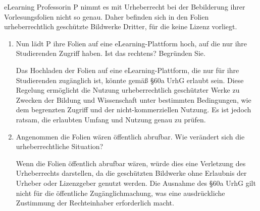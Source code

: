 \documentclass{article}
\begin{document}
\begin{exercise}{eLearning}
  Professorin P nimmt es mit Urheberrecht bei der Bebilderung ihrer Vorlesungsfolien nicht so genau. Daher befinden sich in den Folien urheberrechtlich geschützte Bildwerke Dritter, für die keine Lizenz vorliegt.
  \begin{enumerate}
    \item Nun lädt P ihre Folien auf eine eLearning-Plattform hoch, auf die nur ihre Studierenden Zugriff haben. Ist das rechtens? Begründen Sie.

          \begin{solution}
            Das Hochladen der Folien auf eine eLearning-Plattform, die nur für ihre Studierenden zugänglich ist, könnte gemäß §60a UrhG erlaubt sein. Diese Regelung ermöglicht die Nutzung urheberrechtlich geschützter Werke zu Zwecken der Bildung und Wissenschaft unter bestimmten Bedingungen, wie dem begrenzten Zugriff und der nicht-kommerziellen Nutzung. Es ist jedoch ratsam, die erlaubten Umfang und Nutzung genau zu prüfen.
          \end{solution}
    \item Angenommen die Folien wären öffentlich abrufbar. Wie verändert sich die urheberrechtliche Situation?

          \begin{solution}
            Wenn die Folien öffentlich abrufbar wären, würde dies eine Verletzung des Urheberrechts darstellen, da die geschützten Bildwerke ohne Erlaubnis der Urheber oder Lizenzgeber genutzt werden. Die Ausnahme des §60a UrhG gilt nicht für die öffentliche Zugänglichmachung, was eine ausdrückliche Zustimmung der Rechteinhaber erforderlich macht.
          \end{solution}
  \end{enumerate}
\end{exercise}
\end{document}
